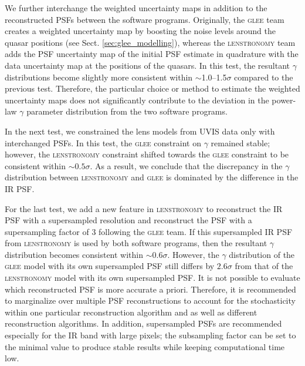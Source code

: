 \documentclass[longauth]{aa}
\newcommand{\ajsiii}[1]{{{#1}}}
\newcommand{\kw}[1]{{{#1}}}
\newcommand{\suyu}[1]{{{#1}}}
\begin{document}
We further interchange \ajsiii{the weighted uncertainty maps} in addition to the reconstructed PSFs between the software programs. \ajsiii{Originally, the \textsc{glee} team creates a weighted uncertainty map by boosting the noise levels around the quasar positions (see Sect. \ref{sec:glee_modelling}), whereas the \textsc{lenstronomy} team adds the PSF uncertainty map of the initial PSF estimate in quadrature with the data uncertainty map at the positions of the quasars.}  In this test, the resultant $\gamma$ distributions become slightly more consistent within $\sim$1.0--1.5$\sigma$ compared to the previous test. Therefore, the particular choice or method to estimate the \ajsiii{weighted uncertainty maps} does not significantly contribute to the deviation in the power-law $\gamma$ parameter distribution from the two software programs. %

In the next test, we constrained the lens models from UVIS data only with interchanged PSFs. In this test, the \textsc{glee} constraint on $\gamma$ remained stable; however, the \textsc{lenstronomy} constraint shifted towards the \textsc{glee} constraint to be consistent within $\sim0.5\sigma$. As a result, we conclude that the discrepancy in the $\gamma$ distribution between \textsc{lenstronomy} and \textsc{glee} is dominated by the difference in the IR PSF. 

For the last test, we add a new feature in \textsc{lenstronomy} to reconstruct the IR PSF with a supersampled resolution and reconstruct the PSF with a supersampling factor of 3 following the \textsc{glee} team. If this supersampled IR PSF from \textsc{lenstronomy} is used by both software programs, then the resultant $\gamma$ distribution becomes consistent within $\sim0.6\sigma$. However, the $\gamma$ distribution of the \textsc{glee} model with its own supersampled PSF still differs by $2.6\sigma$ from that of the \textsc{lenstronomy} model with its own supersampled PSF. It is not possible to evaluate which reconstructed PSF is more accurate {a priori}. Therefore, it is recommended to marginalize over multiple PSF reconstructions to account for the stochasticity within one particular reconstruction algorithm and as well as different reconstruction algorithms. \suyu{In addition, supersampled PSFs are recommended especially for the IR band with large pixels; the subsampling factor can be set to the minimal value to produce stable results while keeping computational time low. }
\end{document}
